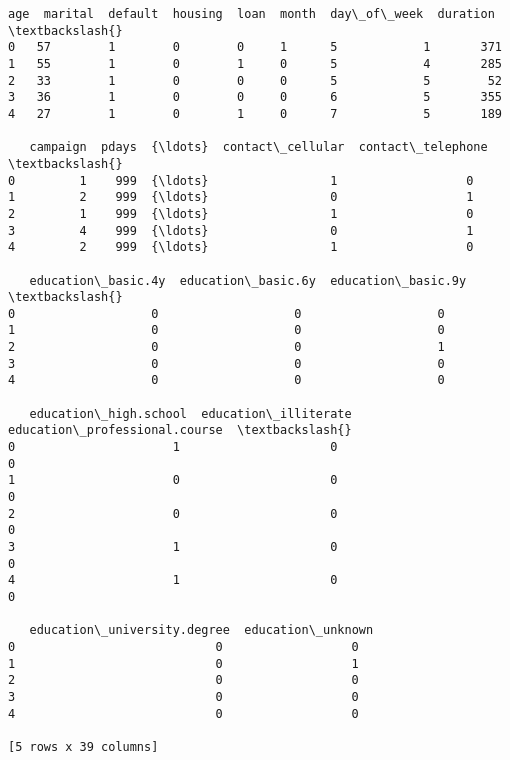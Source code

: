 \documentclass[11pt]{article}
\makeatletter
\newcommand{\boxspacing}{\kern\kvtcb@left@rule\kern\kvtcb@boxsep}
\newcommand{\prompt}[4]{
        {\ttfamily\llap{{\color{#2}[#3]:\hspace{3pt}#4}}\vspace{-\baselineskip}}
    }
\makeatother
\begin{document}
            \begin{tcolorbox}[breakable, size=fbox, boxrule=.5pt, pad at break*=1mm, opacityfill=0]
\prompt{Out}{outcolor}{44}{\boxspacing}
\begin{Verbatim}[commandchars=\\\{\}]
   age  marital  default  housing  loan  month  day\_of\_week  duration  \textbackslash{}
0   57        1        0        0     1      5            1       371
1   55        1        0        1     0      5            4       285
2   33        1        0        0     0      5            5        52
3   36        1        0        0     0      6            5       355
4   27        1        0        1     0      7            5       189

   campaign  pdays  {\ldots}  contact\_cellular  contact\_telephone  \textbackslash{}
0         1    999  {\ldots}                 1                  0
1         2    999  {\ldots}                 0                  1
2         1    999  {\ldots}                 1                  0
3         4    999  {\ldots}                 0                  1
4         2    999  {\ldots}                 1                  0

   education\_basic.4y  education\_basic.6y  education\_basic.9y  \textbackslash{}
0                   0                   0                   0
1                   0                   0                   0
2                   0                   0                   1
3                   0                   0                   0
4                   0                   0                   0

   education\_high.school  education\_illiterate  education\_professional.course  \textbackslash{}
0                      1                     0                              0
1                      0                     0                              0
2                      0                     0                              0
3                      1                     0                              0
4                      1                     0                              0

   education\_university.degree  education\_unknown
0                            0                  0
1                            0                  1
2                            0                  0
3                            0                  0
4                            0                  0

[5 rows x 39 columns]
\end{Verbatim}
\end{tcolorbox}
        
\end{document}
